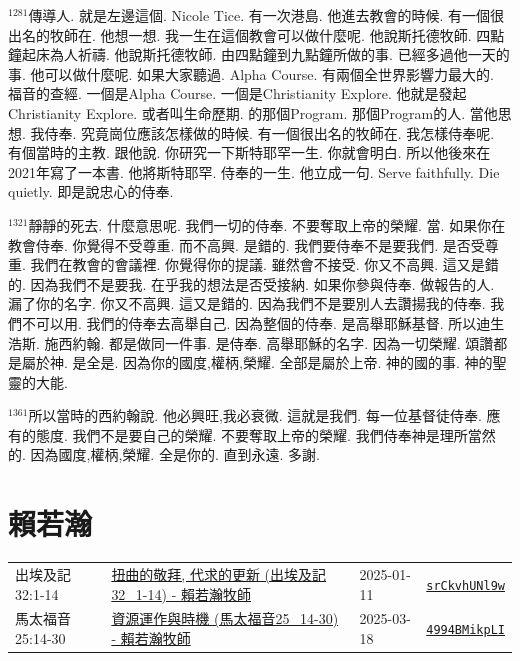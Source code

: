 \documentclass{book}
\begin{document}
$^{1281}$傳導人.
就是左邊這個.
Nicole Tice.
有一次港島.
他進去教會的時候.
有一個很出名的牧師在.
他想一想.
我一生在這個教會可以做什麼呢.
他說斯托德牧師.
四點鐘起床為人祈禱.
他說斯托德牧師.
由四點鐘到九點鐘所做的事.
已經多過他一天的事.
他可以做什麼呢.
如果大家聽過.
Alpha Course.
有兩個全世界影響力最大的.
福音的查經.
一個是Alpha Course.
一個是Christianity Explore.
他就是發起Christianity Explore.
或者叫生命歷期.
的那個Program.
那個Program的人.
當他思想.
我侍奉.
究竟崗位應該怎樣做的時候.
有一個很出名的牧師在.
我怎樣侍奉呢.
有個當時的主教.
跟他說.
你研究一下斯特耶罕一生.
你就會明白.
所以他後來在2021年寫了一本書.
他將斯特耶罕.
侍奉的一生.
他立成一句.
Serve faithfully.
Die quietly.
即是說忠心的侍奉.

$^{1321}$靜靜的死去.
什麼意思呢.
我們一切的侍奉.
不要奪取上帝的榮耀.
當.
如果你在教會侍奉.
你覺得不受尊重.
而不高興.
是錯的.
我們要侍奉不是要我們.
是否受尊重.
我們在教會的會議裡.
你覺得你的提議.
雖然會不接受.
你又不高興.
這又是錯的.
因為我們不是要我.
在乎我的想法是否受接納.
如果你參與侍奉.
做報告的人.
漏了你的名字.
你又不高興.
這又是錯的.
因為我們不是要別人去讚揚我的侍奉.
我們不可以用.
我們的侍奉去高舉自己.
因為整個的侍奉.
是高舉耶穌基督.
所以迪生浩斯.
施西約翰.
都是做同一件事.
是侍奉.
高舉耶穌的名字.
因為一切榮耀.
頌讚都是屬於神.
是全是.
因為你的國度,權柄,榮耀.
全部是屬於上帝.
神的國的事.
神的聖靈的大能.

$^{1361}$所以當時的西約翰說.
他必興旺,我必衰微.
這就是我們.
每一位基督徒侍奉.
應有的態度.
我們不是要自己的榮耀.
不要奪取上帝的榮耀.
我們侍奉神是理所當然的.
因為國度,權柄,榮耀.
全是你的.
直到永遠.
多謝.
\newpage



\chapter{賴若瀚}\label{ch:preacher14}
\begin{multicols}{3}
\minitoc
\end{multicols}
{ \scriptsize


\begin{xltabular}{\textwidth}{|p{0.15\textwidth} p{0.6\textwidth}|p{0.07\textwidth} p{0.1\textwidth}|}
\hline
出埃及記 32:1-14 & \hyperref[sec:srCkvhUNl9w]{扭曲的敬拜, 代求的更新 (出埃及記32\_1-14) -  賴若瀚牧師} & 2025-01-11 & \href{https://youtube.com/watch?v=srCkvhUNl9w}{\texttt{srCkvhUNl9w}} \\
馬太福音 25:14-30 & \hyperref[sec:4994BMikpLI]{資源運作與時機 (馬太福音25\_14-30) - 賴若瀚牧師} & 2025-03-18 & \href{https://youtube.com/watch?v=4994BMikpLI}{\texttt{4994BMikpLI}} \\
\hline
\end{xltabular}
}
\newpage
\end{document}
